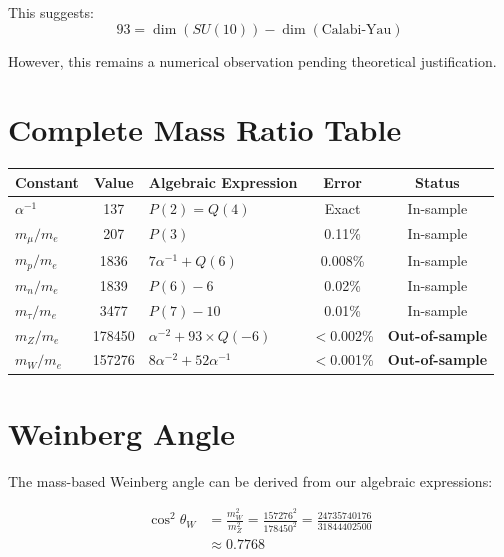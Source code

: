 \documentclass[11pt,a4paper]{article}
\begin{document}
This suggests:
\begin{equation}
93 = \dim(SU(10)) - \dim(\text{Calabi-Yau})
\end{equation}

However, this remains a numerical observation pending theoretical justification.

\section{Complete Mass Ratio Table}

\begin{center}
\begin{tabular}{|l|c|l|c|c|}
\hline
\textbf{Constant} & \textbf{Value} & \textbf{Algebraic Expression} & \textbf{Error} & \textbf{Status} \\
\hline
$\alpha^{-1}$ & 137 & $P(2) = Q(4)$ & Exact & In-sample \\
$m_\mu/m_e$ & 207 & $P(3)$ & 0.11\% & In-sample \\
$m_p/m_e$ & 1836 & $7\alpha^{-1} + Q(6)$ & 0.008\% & In-sample \\
$m_n/m_e$ & 1839 & $P(6) - 6$ & 0.02\% & In-sample \\
$m_\tau/m_e$ & 3477 & $P(7) - 10$ & 0.01\% & In-sample \\
\hline
$m_Z/m_e$ & 178450 & $\alpha^{-2} + 93 \times Q(-6)$ & $<$0.002\% & \textbf{Out-of-sample} \\
$m_W/m_e$ & 157276 & $8\alpha^{-2} + 52\alpha^{-1}$ & $<$0.001\% & \textbf{Out-of-sample} \\
\hline
\end{tabular}
\end{center}

\section{Weinberg Angle}

The mass-based Weinberg angle can be derived from our algebraic expressions:

\begin{align}
\cos^2\theta_W &= \frac{m_W^2}{m_Z^2} = \frac{157276^2}{178450^2} = \frac{24735740176}{31844402500} \\
&\approx 0.7768
\end{align}
\end{document}
